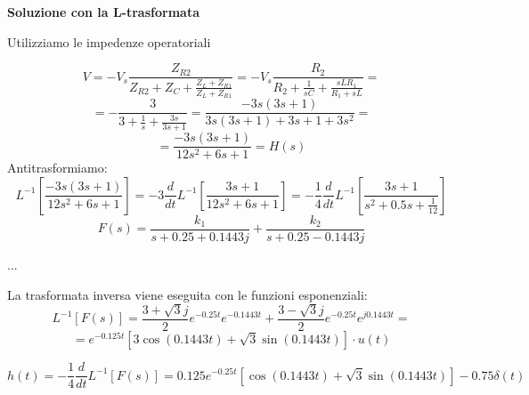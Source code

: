\textbf{Soluzione con la L-trasformata}

Utilizziamo le impedenze operatoriali

$$
V = -V_s\frac{Z_{R2}}{Z_{R2}+Z_C+\frac{Z_L+Z_{R1}}{Z_L+Z_{R1}}} = -V_s\frac{R_2}{R_2 + \frac{1}{sC} + 
\frac{sLR_1}{R_1+sL}} =
$$
$$
= -\frac{3}{3+\frac{1}{s} + \frac{3 s}{3s + 1}} = \frac{-3 s (3s + 1)}{3s(3s+1) + 3s+1 + 3s^2} = 
$$
$$
= \frac{- 3s(3s+1)}{12s^2+6s+1} = H(s)
$$
Antitrasformiamo:
$$
L^{-1}\left[\frac{-3s(3s+1)}{12s^2+6s +1}\right] = -3 \frac{d}{dt}L^{-1} \left[\frac{3s+1}{12s^2+6s+1}\right] = -\frac{1}{4} \frac{d}{dt} L^{-1} \left[\frac{3s+1}{s^2+0.5s + \frac{1}{12}}\right]
$$
$$
F(s) = \frac{k_1}{s+0.25+0.1443j} + \frac{k_2}{s+0.25-0.1443j}
$$

...

La trasformata inversa viene eseguita con le funzioni esponenziali:
$$
L^{-1}[F(s)] = \frac{3+\sqrt{3}j}{2}e^{-0.25 t}e^{-0.1443 t} + \frac{3-\sqrt{3}j}{2}e^{-0.25 t}e^{j0.1443 t} =$$
$$
= e^{-0.125 t}\left[3\cos(0.1443 t) + \sqrt{3}\sin(0.1443 t)\right]\cdot u(t)
$$

$$
h(t) = -\frac{1}{4} \frac{d}{dt}L^{-1}[F(s)] = 0.125 e ^{-0.25 t}[\cos(0.1443 t) + \sqrt{3}\sin(0.1443 t)] - 0.75\delta(t)
$$
